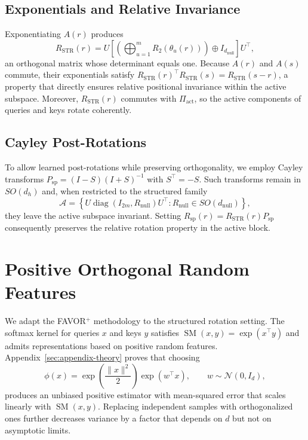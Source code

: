 \documentclass[11pt]{article}
\begin{document}
\subsection{Exponentials and Relative Invariance}

Exponentiating $A(r)$ produces
\[
R_{\mathrm{STR}}(r) = U \left[\left(\bigoplus_{u=1}^m R_2(\theta_u(r))\right) \oplus I_{d_{\mathrm{null}}}\right] U^\top,
\]
an orthogonal matrix whose determinant equals one. Because $A(r)$ and $A(s)$ commute, their
exponentials satisfy $R_{\mathrm{STR}}(r)^\top R_{\mathrm{STR}}(s) = R_{\mathrm{STR}}(s-r)$, a property
that directly ensures relative positional invariance within the active subspace. Moreover,
$R_{\mathrm{STR}}(r)$ commutes with $\Pi_{\mathrm{act}}$, so the active components of queries and keys
rotate coherently.

\subsection{Cayley Post-Rotations}

To allow learned post-rotations while preserving orthogonality, we employ Cayley transforms
$P_{\mathrm{sp}} = (I-S)(I+S)^{-1}$ with $S^\top = -S$. Such transforms remain in $SO(d_h)$ and,
when restricted to the structured family
\[
\mathcal{A} = \left\{U \operatorname{diag}(I_{2m}, R_{\mathrm{null}}) U^\top: R_{\mathrm{null}}\in SO(d_{\mathrm{null}})\right\},
\]
they leave the active subspace invariant. Setting $R_{\mathrm{sp}}(r) = R_{\mathrm{STR}}(r) P_{\mathrm{sp}}$
consequently preserves the relative rotation property in the active block.

\section{Positive Orthogonal Random Features}
\label{sec:favor-structured}

We adapt the FAVOR$^+$ methodology to the structured rotation setting. The softmax kernel for
queries $x$ and keys $y$ satisfies $\operatorname{SM}(x,y) = \exp(x^\top y)$ and admits representations
based on positive random features. Appendix~\ref{sec:appendix-theory} proves that choosing
\[
\phi(x) = \exp\left(\frac{\|x\|^2}{2}\right) \exp(w^\top x),
\qquad w \sim \mathcal{N}(0,I_d),
\]
produces an unbiased positive estimator with mean-squared error that scales linearly with $\operatorname{SM}(x,y)$.
Replacing independent samples with orthogonalized ones further decreases variance by a factor that
depends on $d$ but not on asymptotic limits.
\end{document}
